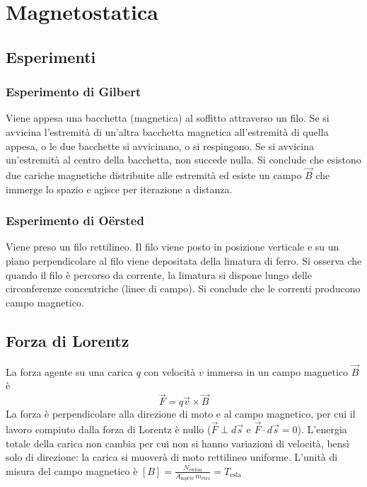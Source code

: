 \documentclass[a4paper]{article}
\begin{document}
\newpage

\section{Magnetostatica}
\subsection{Esperimenti}
\subsubsection*{Esperimento di Gilbert}
Viene appesa una bacchetta (magnetica) al soffitto attraverso un filo. Se si avvicina l'estremità di un'altra bacchetta magnetica
all'estremità di quella appesa, o le due bacchette si avvicinano, o si respingono. Se si avvicina un'estremità al centro della
bacchetta, non succede nulla. Si conclude che esistono due cariche magnetiche distribuite alle estremità ed esiste un campo \(\vec{B}\)
che immerge lo spazio e agisce per iterazione a distanza.

\subsubsection*{Esperimento di Oërsted}
Viene preso un filo rettilineo. Il filo viene posto in posizione verticale e su un piano perpendicolare al filo viene depositata
della limatura di ferro. Si osserva che quando il filo è percorso da corrente, la limatura si dispone lungo delle circonferenze
concentriche (linee di campo). Si conclude che le correnti producono campo magnetico.

\subsection{Forza di Lorentz}
La forza agente su una carica \(q\) con velocità \(v\) immersa in un campo magnetico \(\vec{B}\) è
\[\vec{F} = q \vec{v} \times \vec{B}\]
La forza è perpendicolare alla direzione di moto e al campo magnetico, per cui il lavoro compiuto dalla forza di Lorentz è nullo
(\(\vec{F} \perp d\vec{s}\) e \(\vec{F} \cdot d\vec{s} = 0\)). L'energia totale della carica non cambia per cui non si hanno
variazioni di velocità, bensì solo di direzione: la carica si muoverà di moto rettilineo uniforme.
L'unità di misura del campo magnetico è \([B] = \frac{N_\text{ewton}}{A_\text{mpère} \, m_\text{etro}} = T_\text{esla}\)
\end{document}
